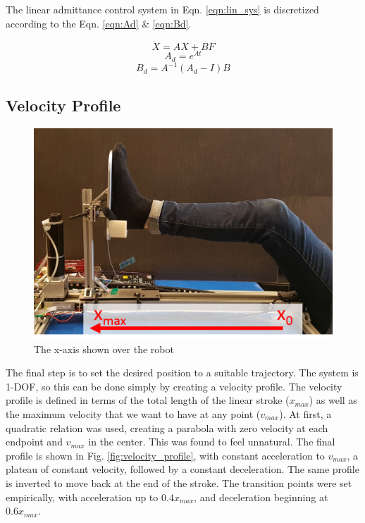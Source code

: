 \documentclass[12pt]{report}
\begin{document}
	The linear admittance control system in Eqn. \ref{eqn:lin_sys} is discretized according to the Eqn. \ref{eqn:Ad} \& \ref{eqn:Bd}.
	
	\begin{equation} \label{eqn:lin_sys} 
	\dot{X} = AX + BF
	\end{equation}
	\begin{equation} \label{eqn:Ad} 
	A_d = e^{At} 
	\end{equation}
	\begin{equation} \label{eqn:Bd} 
	B_d = A^{-1}(A_d - I)B
	\end{equation}
	
	\subsection{Velocity Profile}	
	
		\begin{figure}[h] 
		\centering
		\includegraphics[width=0.6\linewidth]{axis}
		\caption{The x-axis shown over the robot}
		\label{fig:axis}
	\end{figure}
	
	The final step is to set the desired position to a suitable trajectory. The system is 1-DOF, so this can be done simply by creating a velocity profile. The velocity profile is defined in terms of the total length of the linear stroke ($x_{max}$) as well as the maximum velocity that we want to have at any point ($v_{max}$). At first, a quadratic relation was used, creating a parabola with zero velocity at each endpoint and $v_{max}$ in the center. This was found to feel unnatural. The final profile is shown in Fig. \ref{fig:velocity_profile}, with constant acceleration to $v_{max}$, a plateau of constant velocity, followed by a constant deceleration. The same profile is inverted to move back at the end of the stroke. The transition points were set empirically, with acceleration up to $0.4 x_{max}$, and deceleration beginning at $0.6 x_{max}$. 
	
\end{document}
